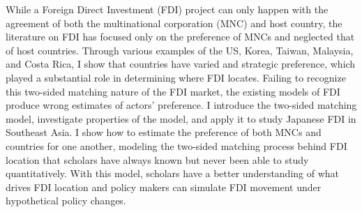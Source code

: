 \abstract

While a Foreign Direct Investment (FDI) project can only happen with the agreement of both the multinational corporation (MNC) and host country, the literature on FDI has focused only on the preference of MNCs and neglected that of host countries. Through various examples of the US, Korea, Taiwan, Malaysia, and Costa Rica, I show that countries have varied and strategic preference, which played a substantial role in determining where FDI locates. Failing to recognize this two-sided matching nature of the FDI market, the existing models of FDI produce wrong estimates of actors' preference. I introduce the two-sided matching model, investigate properties of the model, and apply it to study Japanese FDI in Southeast Asia. I show how to estimate the preference of both MNCs and countries for one another, modeling the two-sided matching process behind FDI location that scholars have always known but never been able to study quantitatively. With this model, scholars have a better understanding of what drives FDI location and policy makers can simulate FDI movement under hypothetical policy changes.